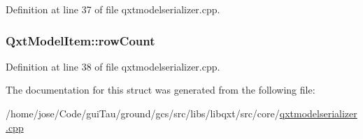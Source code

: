 Definition at line 37 of file qxtmodelserializer.\-cpp.

\hypertarget{struct_qxt_model_item_a5302c19d17dc0e92f7ac65ee2c073ce8}{
\subsubsection[{row\-Count}]{ Qxt\-Model\-Item\-::row\-Count}}\label{struct_qxt_model_item_a5302c19d17dc0e92f7ac65ee2c073ce8}


Definition at line 38 of file qxtmodelserializer.\-cpp.



The documentation for this struct was generated from the following file\-:\begin{DoxyCompactItemize}
\item 
/home/jose/\-Code/gui\-Tau/ground/gcs/src/libs/libqxt/src/core/\hyperlink{qxtmodelserializer_8cpp}{qxtmodelserializer.\-cpp}\end{DoxyCompactItemize}
